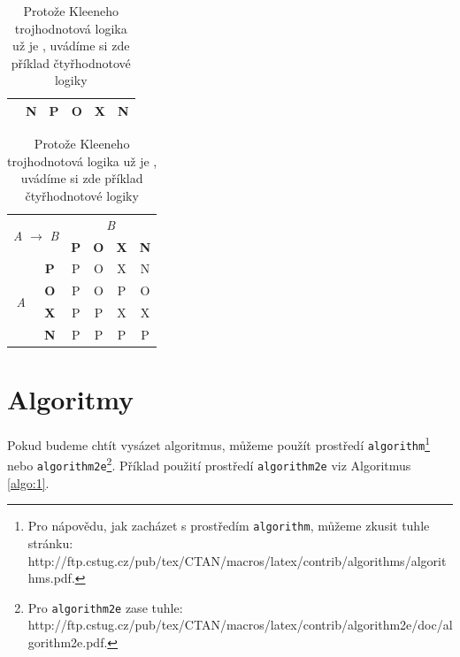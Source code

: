 \documentclass[a4paper,11pt, hidelinks]{article}
\begin{document}
\begin{table}[h]
\begin{subtable}{0.235\textwidth}
\begin{tabular}{|c|c|c|c|c|c|}
        \cline{2-6}
        & \textbf{N} & P & O & X & N \\
        \hline 
    \end{tabular}
\end{subtable}
\;
\begin{subtable}{0.235\textwidth}
    \centering
    \begin{tabular}{|c|c|c|c|c|c|}
        \hline
        \multicolumn{2}{|c|}{\multirow{2}{*}{\textit{A} $\to$ \textit{B}}} & \multicolumn{4}{|c|}{\textit{B}} \\
        \cline{3-6}
        \multicolumn{2}{|c|}{} &\textbf{P} & \textbf{O} & \textbf{X} & \textbf{N} \\
        \hline
        \multirow{4}{*}{\textit{A}} & \textbf{P} & P & O & X & N \\
        \cline{2-6}
        & \textbf{O} & P & O & P & O \\
        \cline{2-6}
        & \textbf{X} & P & P & X & X \\
        \cline{2-6}
        & \textbf{N} & P & P & P & P \\
        \hline 
    \end{tabular}
\end{subtable}
\caption{Protože Kleeneho trojhodnotová logika už je , uvádíme si zde příklad čtyřhodnotové logiky}
\label{tab:2}
\end{table}


\newpage 

\section{Algoritmy}
\label{sec:3}
Pokud budeme chtít vysázet algoritmus, můžeme použít prostředí \texttt{algorithm}\footnote[2]{Pro nápovědu, jak zacházet s prostředím \texttt{algorithm}, můžeme zkusit tuhle stránku: \\
http://ftp.cstug.cz/pub/tex/CTAN/macros/latex/contrib/algorithms/algorithms.pdf.}
nebo \texttt{algorithm2e}\footnote[3]{Pro \texttt{algorithm2e} zase tuhle: http://ftp.cstug.cz/pub/tex/CTAN/macros/latex/contrib/algorithm2e/doc/algorithm2e.pdf.}.
Příklad použití prostředí \texttt{algorithm2e} viz Algoritmus \ref*{algo:1}.
\end{document}
